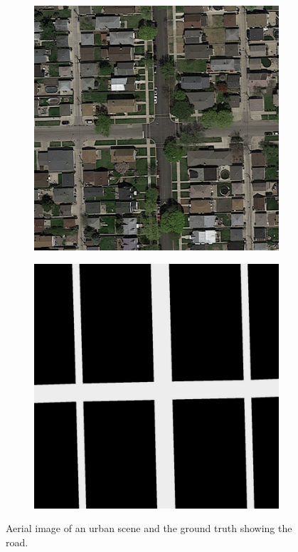 \documentclass[10pt,conference,compsocconf]{IEEEtran}
\begin{document}
\begin{figure}[h]
	\centering
	\begin{subfigure}{.2\textwidth}
		\includegraphics[width=1\textwidth]{figs/img1.png}
	\end{subfigure}
	\begin{subfigure}{.2\textwidth}
		\includegraphics[width=1\textwidth]{figs/groundtruth1.png}
	\end{subfigure}
	\caption{Aerial image of an urban scene and the ground truth showing the road.}
\end{figure}
\end{document}
